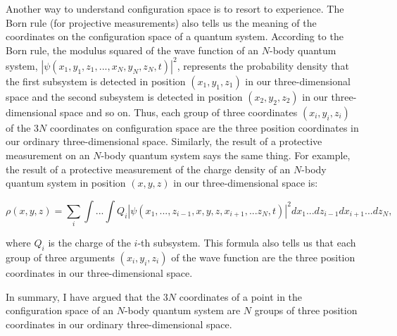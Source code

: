 Another way to understand configuration space is to resort to experience. The Born rule (for projective measurements) also tells us the meaning of the coordinates on the configuration space of a quantum system.
According to the Born rule,  the modulus squared of the wave function of an $N$-body quantum system, $|\psi(x_1,y_1,z_1, ..., x_N,y_N,z_N,t)|^2$, represents the probability density that the first subsystem is detected in position $(x_1,y_1,z_1)$ in our three-dimensional space and the second subsystem is detected in position $(x_2,y_2,z_2)$ in our three-dimensional space and so on. Thus, each group of three coordinates $(x_i, y_i, z_i)$ of the $3N$ coordinates on configuration space are the three position coordinates in our ordinary three-dimensional space. Similarly, the result of a protective measurement on an $N$-body quantum system says the same thing. For example, the result of a protective measurement of the charge density of an $N$-body quantum system in position $(x,y,z)$ in our three-dimensional space is:

\begin{equation}
 \rho(x,y,z)=\sum_i{\int...\int{Q_i|\psi(x_1, ..., z_{i-1}, x, y, z, x_{i+1},... z_N, t)|^2dx_1 ...dz_{i-1}dx_{i+1}...dz_N}},
\end{equation}

\noindent where $Q_i$ is the charge of the $i$-th subsystem. This formula also tells us that each group of three arguments $(x_i, y_i, z_i)$ of the wave function are the three position coordinates in our three-dimensional space. 

In summary, I have argued that the $3N$ coordinates of a point in the configuration space of an $N$-body quantum system are $N$ groups of three position coordinates in our ordinary three-dimensional space. 

